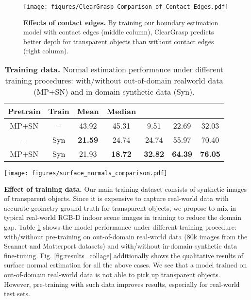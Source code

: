 \documentclass[letterpaper, 10 pt, conference]{ieeeconf}
\newcommand{\myparagraph}[1]{\vspace{0.03in}\noindent\textbf{#1}}
\begin{document}
\begin{figure}[ht]
\vspace{-1mm}
    \centering
    \texttt{[image: figures/ClearGrasp\_Comparison\_of\_Contact\_Edges.pdf]}
    \caption{\textbf{Effects of contact edges. } By training our boundary estimation model with contact edges (middle column), ClearGrasp predicts better depth for transparent objects than without contact edges (right column).}
    \label{fig:results_contact_edges}
    \vspace{-2mm}
\end{figure}

\begin{table}[t]
    \caption{\textbf{Training data.} Normal estimation performance under different training procedures: with/without out-of-domain realworld data (MP+SN) and in-domain synthetic data (Syn). 
    \label{table:real_pretraining}}
    \vspace{-2mm}
    {\centering
    \setlength\tabcolsep{5.8 pt}
    \begin{tabular}{cc|ccccc}
        \toprule
        Pretrain & Train & Mean & Median &  &  &  \\
        \midrule
        MP+SN &  -  & 43.92 & 45.31 & 9.51 & 22.69 & 32.03 \\
        -     & Syn & \textbf{21.59} & 24.74 & 24.74 & 55.97 & 70.40 \\
        MP+SN & Syn & 21.93 & \textbf{18.72} &\textbf{32.82} & \textbf{64.39} &\textbf{76.05} \\
        \bottomrule 
    \end{tabular}
    }
    \vspace{1mm}
    \texttt{[image: figures/surface\_normals\_comparison.pdf]}     
    \vspace{-6mm}
\end{table}

\myparagraph{Effect of training data.}
Our main training dataset consists of synthetic images of transparent objects. Since it is expensive to capture real-world data with accurate geometry ground truth for transparent objects, we propose to mix in typical real-world RGB-D indoor scene images in training to reduce the domain gap. 
Table \ref{table:real_pretraining} shows the model performance under different training procedure: with/without pre-training on out-of-domain real-world data (80k images from the Scannet and Matterport datasets) and with/without in-domain synthetic data fine-tuning.  Fig. \ref{fig:results_collage} additionally shows the qualitative results of surface normal estimation for all the above cases. 
We see that a model trained on out-of-domain real-world data is not able to pick up transparent objects. However, pre-training with such data improves results, especially for real-world test sets.
\end{document}
